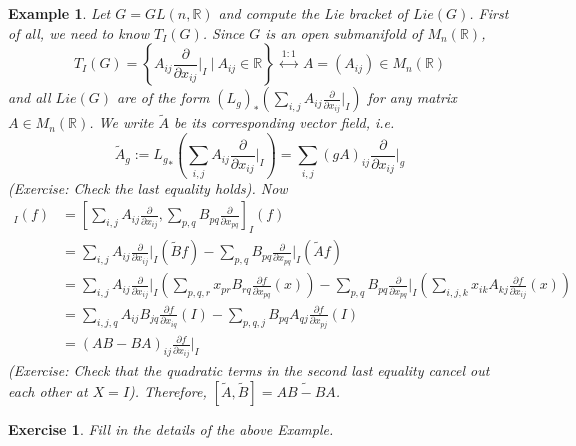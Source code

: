 \documentclass[11pt]{book}
\newtheorem{example}[theorem]{Example}
\newtheorem{exercise}[theorem]{Exercise}
\newcommand{\bb}[1]{\mathbb{#1}}
\begin{document}
\begin{example} \label{vfgl}
Let $G = GL(n,\bb{R})$ and compute the Lie bracket of $Lie(G)$. First of all, we need to know $T_I(G)$. Since $G$ is an open submanifold of $M_n(\bb{R})$,
$$T_I(G) = \left\{ A_{ij}\frac{\partial}{\partial x_{ij}}  \Big|_I\ \Big|\ A_{ij} \in \bb{R} \right\}\ \stackrel{1:1}{\longleftrightarrow}\ A = (A_{ij}) \in M_n(\bb{R})$$
and all $Lie(G)$ are of the form $(L_g)_*(\sum_{i,j} A_{ij}\frac{\partial}{\partial x_{ij}}  \Big|_I)$ for any matrix $A \in M_n(\bb{R})$. We write $\tilde{A}$ be its corresponding vector field, i.e.
$$\tilde{A}_g := {L_g}_*(\sum_{i,j} A_{ij}\frac{\partial}{\partial x_{ij}}  \Big|_I) = \sum_{i,j}(gA)_{ij}\frac{\partial}{\partial x_{ij}}  \Big|_g$$
(Exercise: Check the last equality holds). Now
\begin{align*}
[\tilde{A},\tilde{B}]_I(f) &= [\sum_{i,j}A_{ij}\frac{\partial}{\partial x_{ij}}, \sum_{p,q}B_{pq}\frac{\partial}{\partial x_{pq}}]_I(f)\\
 &= \sum_{i,j}A_{ij}\frac{\partial}{\partial x_{ij}}  \Big|_I (\tilde{B}f) -  \sum_{p,q}B_{pq}\frac{\partial}{\partial x_{pq}}  \Big|_I (\tilde{A}f)\\
 &= \sum_{i,j}A_{ij}\frac{\partial}{\partial x_{ij}}  \Big|_I (\sum_{p,q,r}x_{pr}B_{rq}\frac{\partial f}{\partial x_{pq}}(x)) - \sum_{p,q}B_{pq}\frac{\partial}{\partial x_{pq}}  \Big|_I (\sum_{i,j,k}x_{ik}A_{kj}\frac{\partial f}{\partial x_{ij}}(x))\\
 &= \sum_{i,j,q}A_{ij}B_{jq}\frac{\partial f}{\partial x_{iq}}(I) - \sum_{p,q,j}B_{pq}A_{qj}\frac{\partial f}{\partial x_{pj}}(I)\\
 &= (AB-BA)_{ij}\frac{\partial f}{\partial x_{ij}}  \Big|_I
\end{align*}
(Exercise: Check that the quadratic terms in the second last equality cancel out each other at $X = I$). Therefore, $[\tilde{A}, \tilde{B}] = \widetilde{AB-BA}$.
\end{example}
\begin{exercise}
Fill in the details of the above Example.
\end{exercise}
\end{document}

